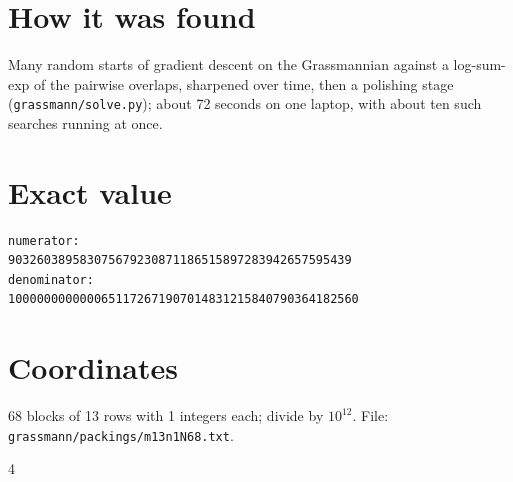 \documentclass[11pt,a4paper]{article}
\begin{document}
\section{How it was found}
Many random starts of gradient descent on the Grassmannian against a log-sum-exp of the pairwise overlaps, sharpened over time, then a polishing stage (\texttt{grassmann/solve.py}); about 72 seconds on one laptop, with about ten such searches running at once.


\appendix
\section{Exact value}
{\small
\begin{verbatim}
numerator:
903260389583075679230871186515897283942657595439
denominator:
1000000000000651172671907014831215840790364182560
\end{verbatim}}

\section{Coordinates}
68 blocks of 13 rows with 1 integers each; divide by $10^{12}$. File: \texttt{grassmann/packings/m13n1N68.txt}.
{\tiny
\begin{multicols}{4}
\end{multicols}}
\end{document}
